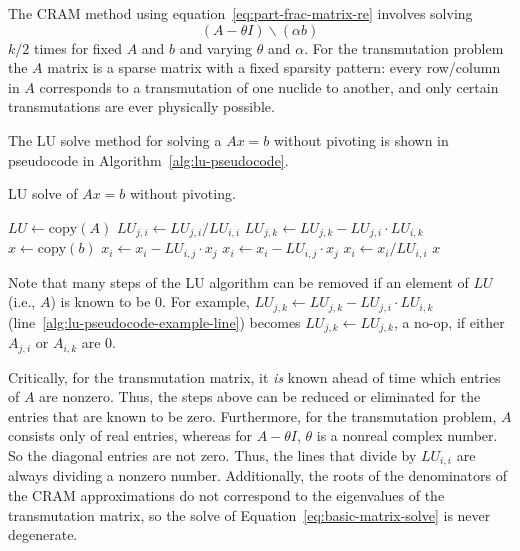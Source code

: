 The CRAM method using equation~\ref{eq:part-frac-matrix-re} involves solving
\begin{equation}
\label{eq:basic-matrix-solve}
 (A - \theta I)\backslash(\alpha b)
\end{equation}
$k/2$ times for fixed $A$ and $b$ and varying $\theta$ and $\alpha$. For the
transmutation problem the $A$ matrix is a sparse matrix with a fixed sparsity
pattern: every row/column in $A$ corresponds to a transmutation of one nuclide
to another, and only certain transmutations are ever physically possible.

The LU solve method for solving a $Ax=b$ without pivoting is shown in
pseudocode in Algorithm~\ref{alg:lu-pseudocode}.
\begin{algorithm}
  \caption{LU solve of $Ax=b$ without pivoting.}\label{alg:lu-pseudocode}
  \begin{algorithmic}[1]
  \STATE {}
  \STATE {}
  \STATE
  \STATE $LU \leftarrow \mathrm{copy}(A)$
  \STATE
        \STATE $LU_{j, i} \leftarrow LU_{j, i}/LU_{i, i}$
    \ENDFOR
  \ENDFOR
  \STATE
    \STATE $LU_{j, k} \leftarrow LU_{j, k} - LU_{j, i}\cdot LU_{i, k}$\label{alg:lu-pseudocode-example-line}
  \ENDFOR
  \STATE
  \STATE {}
  \STATE $x \leftarrow \mathrm{copy}(b)$
  \STATE
  \STATE {}
          \STATE $x_i \leftarrow x_i - LU_{i, j}\cdot x_j$
      \ENDFOR
  \ENDFOR
  \STATE
  \STATE {}
          \STATE $x_i \leftarrow x_i -LU_{i, j}\cdot x_j$
      \ENDFOR
      \STATE $x_i \leftarrow x_i/LU_{i, i}$
  \ENDFOR
  \STATE
  \RETURN $x$

\end{algorithmic}
\end{algorithm}

Note that many steps of the LU algorithm can be removed if an element of $LU$
(i.e., $A$) is known to be 0. For example,
$LU_{j, k} \leftarrow LU_{j, k} - LU_{j, i}\cdot LU_{i, k}$
(line~\ref{alg:lu-pseudocode-example-line}) becomes
$LU_{j, k} \leftarrow LU_{j, k}$, a no-op, if either $A_{j, i}$ or $A_{i, k}$
are 0.

Critically, for the transmutation matrix, it \textit{is} known ahead of time
which entries of $A$ are nonzero. Thus, the steps above can be reduced or
eliminated for the entries that are known to be zero. Furthermore, for the
transmutation problem, $A$ consists only of real entries, whereas for
$A - \theta I$, $\theta$ is a nonreal complex number. So the diagonal entries
are not zero. Thus, the lines that divide by $LU_{i,i}$ are always dividing a
nonzero number.  Additionally, the roots of the denominators of the CRAM
approximations do not correspond to the eigenvalues of the transmutation
matrix, so the solve of Equation~\ref{eq:basic-matrix-solve} is never
degenerate.

